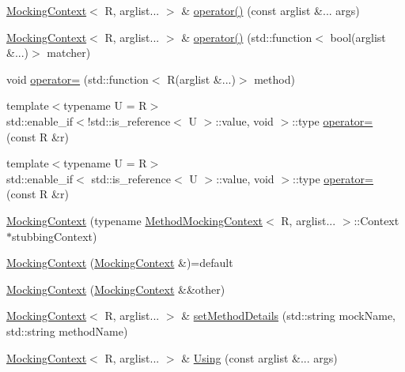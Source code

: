 \begin{DoxyCompactItemize}
\item 
\mbox{\hyperlink{classfakeit_1_1MockingContext}{Mocking\+Context}}$<$ R, arglist... $>$ \& \mbox{\hyperlink{classfakeit_1_1MockingContext_a70a55886680449fa36e8f5869af93389}{operator()}} (const arglist \&... args)
\item 
\mbox{\hyperlink{classfakeit_1_1MockingContext}{Mocking\+Context}}$<$ R, arglist... $>$ \& \mbox{\hyperlink{classfakeit_1_1MockingContext_aff3a6b6107f5bc4e028e75bf9b55f313}{operator()}} (std\+::function$<$ bool(arglist \&...)$>$ matcher)
\item 
void \mbox{\hyperlink{classfakeit_1_1MockingContext_aadefb2bd6c1dee1f3aa8902277dd3fc2}{operator=}} (std\+::function$<$ R(arglist \&...)$>$ method)
\item 
{\footnotesize template$<$typename U  = R$>$ }\\std\+::enable\+\_\+if$<$!std\+::is\+\_\+reference$<$ U $>$\+::value, void $>$\+::type \mbox{\hyperlink{classfakeit_1_1MockingContext_adfac3df2408adaa86efec81bd5533a6d}{operator=}} (const R \&r)
\item 
{\footnotesize template$<$typename U  = R$>$ }\\std\+::enable\+\_\+if$<$ std\+::is\+\_\+reference$<$ U $>$\+::value, void $>$\+::type \mbox{\hyperlink{classfakeit_1_1MockingContext_ad5e903b223858dbe67f1da1523ef0d60}{operator=}} (const R \&r)
\item 
\mbox{\hyperlink{classfakeit_1_1MockingContext_a5700542bcb10d5ff297e389f9ea988e8}{Mocking\+Context}} (typename \mbox{\hyperlink{classfakeit_1_1MethodMockingContext}{Method\+Mocking\+Context}}$<$ R, arglist... $>$\+::Context $\ast$stubbing\+Context)
\item 
\mbox{\hyperlink{classfakeit_1_1MockingContext_aa4fec015b3088d8d98449f6a90525e0d}{Mocking\+Context}} (\mbox{\hyperlink{classfakeit_1_1MockingContext}{Mocking\+Context}} \&)=default
\item 
\mbox{\hyperlink{classfakeit_1_1MockingContext_a4611ccb2f40b25362c40316ec87c0da5}{Mocking\+Context}} (\mbox{\hyperlink{classfakeit_1_1MockingContext}{Mocking\+Context}} \&\&other)
\item 
\mbox{\hyperlink{classfakeit_1_1MockingContext}{Mocking\+Context}}$<$ R, arglist... $>$ \& \mbox{\hyperlink{classfakeit_1_1MockingContext_a07958a59915dcc84633818a9644e1921}{set\+Method\+Details}} (std\+::string mock\+Name, std\+::string method\+Name)
\item 
\mbox{\hyperlink{classfakeit_1_1MockingContext}{Mocking\+Context}}$<$ R, arglist... $>$ \& \mbox{\hyperlink{classfakeit_1_1MockingContext_ade706bb68e9ffb128fad353a3b15758b}{Using}} (const arglist \&... args)

\end{DoxyCompactItemize}
